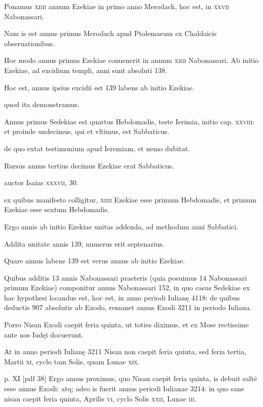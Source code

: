 \begin{parnumbers}
Ponamus \textsc{xiiii} annum Ezekiae in
primo anno Merodach, hoc est, in \textsc{xxvii} Nabonassari.

Nam is est
annus primus Merodach apud Ptolemaeum ex Chaldaicis obseruationibus. 

Hoc modo annus primus Ezekiae conuenerit in annum
\textsc{xiiii} Nabonassari. Ab initio Ezekiae, ad excidium templi, anni
sunt absoluti 138.

Hoc est, annus ipsius excidii est 139 labens ab initio
Ezekiae.

quod ita demonstramus. 

Annus primus Sedekiae est
quartus Hebdomadis, teste Ierimia, initio cap. \textsc{xxviii}: et proinde
undecimus, qui et vltimus, est Sabbaticus. 

de quo extat testimonium
apud Ieremiam, et nemo dubitat.

Rursus annus tertius decimus
Ezekiae erat Sabbaticus. 

auctor Isaias \textsc{xxxvii}, 30.

ex quibus
manifesto colligitur, \textsc{xiiii} Ezekiae esse primum Hebdomadis, et primum
Ezekiae esse sextum Hebdomadis. 

Ergo annis ab initio Ezekiae unitas addenda, ad methodum anni Sabbatici.

Addita unitate annis
139, numerus erit septenarius. 

Quare annus labens 139 est verus
annus ab initio Ezekiae.

Quibus additis 13 annis Nabonassari praeteris
(quia posuimus 14 Nabonassari primum Ezekiae) componitur
annus Nabonassari 152, in quo casus Sedekiae ex hac hypothesi
locandus est, hoc est, in anno periodi Iulianę 4118: de quibus deductis
907 absolutis ab Exodo, remanet annus Exodi 3211 in periodo Iuliana.

Porro Nisan Exodi caepit feria quinta, ut toties diximus, et ex
Mose rectissime ante nos Iudęi docuerunt.

At in anno periodi Iulianę
3211 Nisan non caepit feria quinta, sed feria tertia,
 Martii \textsc{xi}, cyclo tam
Solis, quam Lunae \textsc{xix}.

\clearpage
p. XI [pdf 38]
Ergo annus proximus, quo Nisan caepit feria
quinta, is debuit saltē esse annus Exodi: atq; adeo is fuerit annus periodi
Iulianae 3214: in quo sane nisan caepit feria quinta, Aprilis \textsc{vi},
cyclo Solis \textsc{xxii}, Lunae \textsc{iii}.


\end{parnumbers}
